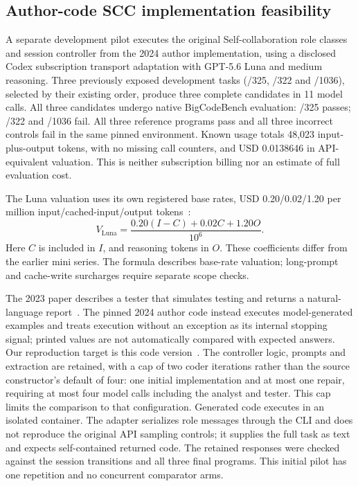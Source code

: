 \subsection{Author-code SCC implementation feasibility}
\label{sec:scc-feasibility}
A separate development pilot executes the original Self-collaboration role classes and session controller from the 2024 author implementation, using a disclosed Codex subscription transport adaptation with GPT-5.6 Luna and medium reasoning. Three previously exposed development tasks (/325, /322 and /1036), selected by their existing order, produce three complete candidates in 11 model calls. All three candidates undergo native BigCodeBench evaluation: /325 passes; /322 and /1036 fail. All three reference programs pass and all three incorrect controls fail in the same pinned environment. Known usage totals 48,023 input-plus-output tokens, with no missing call counters, and USD 0.0138646 in API-equivalent valuation. This is neither subscription billing nor an estimate of full evaluation cost.

The Luna valuation uses its own registered base rates, USD 0.20/0.02/1.20 per million input/cached-input/output tokens~\cite{openai56luna2026}:
\[
V_{\mathrm{Luna}}=\frac{0.20(I-C)+0.02C+1.20O}{10^6}.
\]
Here $C$ is included in $I$, and reasoning tokens in $O$. These coefficients differ from the earlier mini series. The formula describes base-rate valuation; long-prompt and cache-write surcharges require separate scope checks.

The 2023 paper describes a tester that simulates testing and returns a natural-language report~\cite{dong2023selfcollaboration}. The pinned 2024 author code instead executes model-generated examples and treats execution without an exception as its internal stopping signal; printed values are not automatically compared with expected answers. Our reproduction target is this code version~\cite{scc2024source}. The controller logic, prompts and extraction are retained, with a cap of two coder iterations rather than the source constructor's default of four: one initial implementation and at most one repair, requiring at most four model calls including the analyst and tester. This cap limits the comparison to that configuration. Generated code executes in an isolated container. The adapter serializes role messages through the CLI and does not reproduce the original API sampling controls; it supplies the full task as text and expects self-contained returned code. The retained responses were checked against the session transitions and all three final programs. This initial pilot has one repetition and no concurrent comparator arms.

